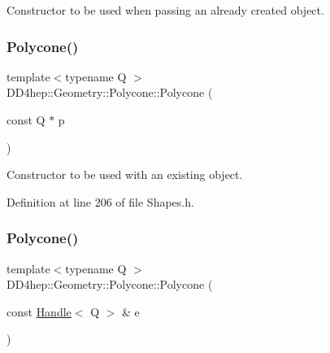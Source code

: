 Constructor to be used when passing an already created object. 

\hypertarget{class_d_d4hep_1_1_geometry_1_1_polycone_a0b335f33b91bb7eb992effd16cf3e03b}{}\label{class_d_d4hep_1_1_geometry_1_1_polycone_a0b335f33b91bb7eb992effd16cf3e03b} 
\subsubsection{\texorpdfstring{Polycone()}{Polycone()}\hspace{0.1cm}{\footnotesize\ttfamily [3/6]}}
{\footnotesize\ttfamily template$<$typename Q $>$ \\
D\+D4hep\+::\+Geometry\+::\+Polycone\+::\+Polycone (\begin{DoxyParamCaption}\item[{const Q $\ast$}]{p }\end{DoxyParamCaption})\hspace{0.3cm}{\ttfamily [inline]}}



Constructor to be used with an existing object. 



Definition at line 206 of file Shapes.\+h.

\hypertarget{class_d_d4hep_1_1_geometry_1_1_polycone_ae8cdcc08d6f8aa832af979e7b84be5ed}{}\label{class_d_d4hep_1_1_geometry_1_1_polycone_ae8cdcc08d6f8aa832af979e7b84be5ed} 
\subsubsection{\texorpdfstring{Polycone()}{Polycone()}\hspace{0.1cm}{\footnotesize\ttfamily [4/6]}}
{\footnotesize\ttfamily template$<$typename Q $>$ \\
D\+D4hep\+::\+Geometry\+::\+Polycone\+::\+Polycone (\begin{DoxyParamCaption}\item[{const \hyperlink{class_d_d4hep_1_1_handle}{Handle}$<$ Q $>$ \&}]{e }\end{DoxyParamCaption})\hspace{0.3cm}{\ttfamily [inline]}}



